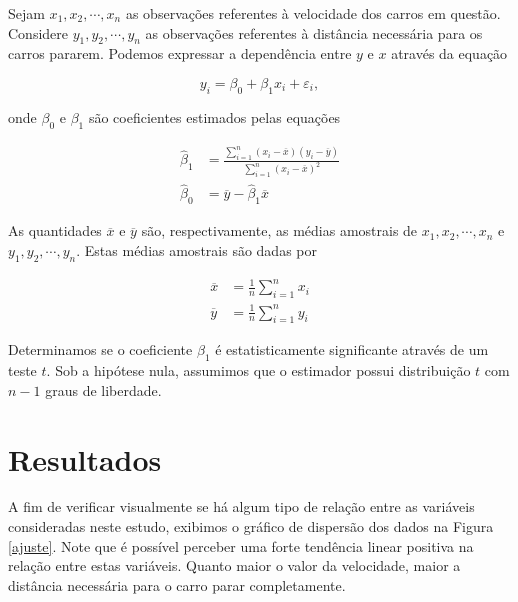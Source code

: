 \documentclass[a4paper,12pt,twoside,printwatermark=false]{modeloLEA}
\numberwithin{equation}{section}
\numberwithin{figure}{section}
\numberwithin{table}{section}
\begin{document}
Sejam \(x_1, x_2, \cdots, x_n\) as observações referentes à velocidade
dos carros em questão. Considere \(y_1, y_2, \cdots, y_n\) as
observações referentes à distância necessária para os carros pararem.
Podemos expressar a dependência entre \(y\) e \(x\) através da equação

\begin{equation}
y_i = \beta_0 + \beta_1x_i + \varepsilon_i,
\end{equation}

\noindent onde \(\beta_0\) e \(\beta_1\) são coeficientes estimados
pelas equações

\begin{align}
\widehat{\beta}_1 &= \frac{\sum_{i=1}^n(x_i-\overline{x})(y_i-\overline{y})}{\sum_{i=1}^n(x_i-\overline{x})^2}  \label{estimadores01} \\
\widehat{\beta}_0 &= \overline{y}-\widehat{\beta}_1\overline{x}  \label{estimadores02}
\end{align}

\noindent As quantidades \(\overline{x}\) e \(\overline{y}\) são,
respectivamente, as médias amostrais de \(x_1, x_2, \cdots, x_n\) e
\(y_1, y_2, \cdots, y_n\). Estas médias amostrais são dadas por

\begin{align}
\overline{x} &= \frac{1}{n}\sum_{i=1}^nx_i \\
\overline{y} &= \frac{1}{n}\sum_{i=1}^ny_i 
\end{align}

Determinamos se o coeficiente \(\beta_1\) é estatisticamente
significante através de um teste \(t\). Sob a hipótese nula, assumimos
que o estimador possui distribuição \(t\) com \(n-1\) graus de
liberdade.

\hypertarget{resultados}{%
\section{Resultados}\label{resultados}}

A fim de verificar visualmente se há algum tipo de relação entre as
variáveis consideradas neste estudo, exibimos o gráfico de dispersão dos
dados na Figura \ref{ajuste}. Note que é possível perceber uma forte
tendência linear positiva na relação entre estas variáveis. Quanto maior
o valor da velocidade, maior a distância necessária para o carro parar
completamente.

\begin{Shaded}
\begin{Highlighting}[]
\NormalTok{(}\OperatorTok{+}
\StringTok{  }\NormalTok{() }\OperatorTok{+}
\StringTok{  }\NormalTok{(}\NormalTok{, }\NormalTok{)}
\end{Highlighting}
\end{Shaded}
\end{document}
